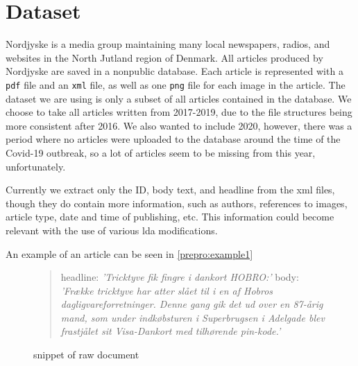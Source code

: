\section{Dataset}\label{sec:dataset}
Nordjyske is a media group maintaining many local newspapers, radios, and websites in the North Jutland region of Denmark.
All articles produced by Nordjyske are saved in a nonpublic database.
Each article is represented with a \texttt{pdf} file and an \texttt{xml} file, as well as one \texttt{png} file for each image in the article.
The dataset we are using is only a subset of all articles contained in the database.
We choose to take all articles written from 2017-2019, due to the file structures being more consistent after 2016.
We also wanted to include 2020, however, there was a period where no articles were uploaded to the database around the time of the Covid-19 outbreak, so a lot of articles seem to be missing from this year, unfortunately.

Currently we extract only the ID, body text, and headline from the xml files, though they do contain more information, such as authors, references to images, article type, date and time of publishing, etc.
This information could become relevant with the use of various \gls{lda} modifications.

An example of an article can be seen in \autoref{prepro:example1}

\begin{figure}[h]
	\begin{quote}
		headline: \textit{'Tricktyve fik fingre i dankort HOBRO:'}
		body: \textit{'Frække tricktyve har atter slået til i en af Hobros dagligvareforretninger. Denne gang gik det ud over en 87-årig mand, som under indkøbsturen i Superbrugsen i Adelgade blev frastjålet sit Visa-Dankort med tilhørende pin-kode.'}
	\end{quote}
	\caption{snippet of raw document}
	\label{prepro:example1}
\end{figure}

